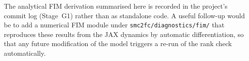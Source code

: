 \begin{remark}\label{rem:fim-where}
The analytical FIM derivation summarised here is recorded in the
project's commit log (Stage~G1) rather than as standalone code. A
useful follow-up would be to add a numerical FIM module under
\texttt{smc2fc/diagnostics/fim/} that reproduces these results from the
JAX dynamics by automatic differentiation, so that any future
modification of the model triggers a re-run of the rank check
automatically.
\end{remark}
